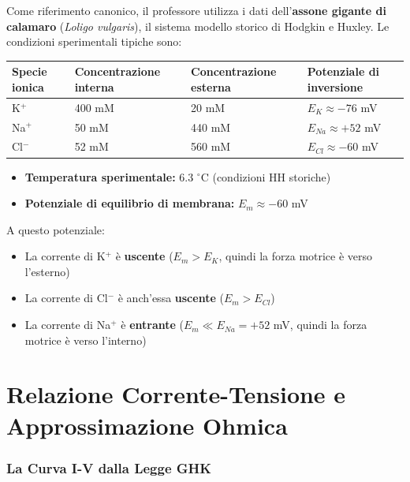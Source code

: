 Come riferimento canonico, il professore utilizza i dati dell'\textbf{assone gigante di calamaro} (\textit{Loligo vulgaris}), il sistema modello storico di Hodgkin e Huxley. Le condizioni sperimentali tipiche sono:

\begin{table}[htbp]
    \centering
    \renewcommand{\arraystretch}{1.3}
    \begin{tabularx}{\textwidth}{|l|X|X|X|}
    \hline
    \textbf{Specie ionica} & \textbf{Concentrazione interna} & \textbf{Concentrazione esterna} & \textbf{Potenziale di inversione} \\
    \hline
    K$^+$ & 400 mM & 20 mM & $E_K \approx -76$ mV \\
    Na$^+$ & 50 mM & 440 mM & $E_{Na} \approx +52$ mV \\
    Cl$^-$ & 52 mM & 560 mM & $E_{Cl} \approx -60$ mV \\
    \hline
    \end{tabularx}
\end{table}

\begin{itemize}
    \item \textbf{Temperatura sperimentale:} 6.3 $^\circ$C (condizioni HH storiche)
    \item \textbf{Potenziale di equilibrio di membrana:} $E_m \approx -60$ mV
\end{itemize}

A questo potenziale:
\begin{itemize}
    \item La corrente di K$^+$ è \textbf{uscente} ($E_m > E_K$, quindi la forza motrice è verso l'esterno)
    \item La corrente di Cl$^-$ è anch'essa \textbf{uscente} ($E_m > E_{Cl}$)
    \item La corrente di Na$^+$ è \textbf{entrante} ($E_m \ll E_{Na} = +52$ mV, quindi la forza motrice è verso l'interno)
\end{itemize}


\section{Relazione Corrente-Tensione e Approssimazione Ohmica}

\subsubsection{La Curva I-V dalla Legge GHK}

